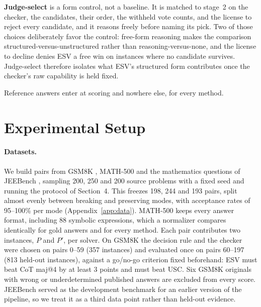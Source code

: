 \documentclass[letterpaper]{article} %
\newcommand{\method}{\textsc{ESV}}   %
\begin{document}
\noindent\textbf{Judge-select} is a form control, not a baseline. It is matched
to stage~2 on the checker, the candidates, their order, the withheld vote
counts, and the license to reject every candidate, and it reasons freely before
naming its pick. Two of those choices deliberately favor the control: free-form
reasoning makes the comparison structured-versus-unstructured rather than
reasoning-versus-none, and the license to decline denies \method{} a free win on
instances where no candidate survives. Judge-select therefore isolates what
\method{}'s structured form contributes once the checker's raw capability is
held fixed.

Reference answers enter at scoring and nowhere else, for every method.

\section{Experimental Setup}
\label{sec:setup}

\paragraph{Datasets.}
We build pairs from GSM8K \cite{cobbe2021training}, MATH-500 \cite{hendrycks2021math,lightman2024let} and the mathematics questions of JEEBench \cite{arora2023jeebench}, sampling 200, 250 and 200 source problems with a fixed seed and running the protocol of Section~4. This freezes 198, 244 and 193 pairs, split almost evenly between breaking and preserving modes, with acceptance rates of 95--100\% per mode (Appendix~\ref{app:data}). MATH-500 keeps every answer format, including 88 symbolic expressions, which a normalizer compares identically for gold answers and for every method. Each pair contributes two instances, $P$ and $P'$, per solver. On GSM8K the decision rule and the checker were chosen on pairs 0--59 (357 instances) and evaluated once on pairs 60--197 (813 held-out instances), against a go/no-go criterion fixed beforehand: ESV must beat CoT maj@4 by at least 3 points and must beat USC. Six GSM8K originals with wrong or underdetermined published answers are excluded from every score. JEEBench served as the development benchmark for an earlier version of the pipeline, so we treat it as a third data point rather than held-out evidence.
\end{document}

